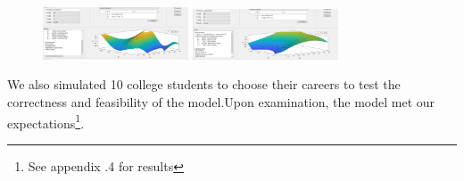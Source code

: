\documentclass[12pt]{article}
\begin{document}
\begin{figure}[htbp]
{\begin{minipage}[t]{0.3\linewidth}
    \end{minipage}
    }%
    {
    \begin{minipage}[t]{0.3\linewidth}
    \centering
    \includegraphics[width=1.7in]{figure/pict5.jpg}
    \end{minipage}
    }
    {
    \begin{minipage}[t]{0.3\linewidth}
    \centering
    \includegraphics[width=1.7in]{figure/pict6.jpg}
    \end{minipage}
    }
    
    \end{figure}
We also simulated 10 college students to choose their careers to test the correctness and feasibility of the model.Upon examination, the model met our expectations\footnote[1]{See appendix .4 for results}.
\end{document}
